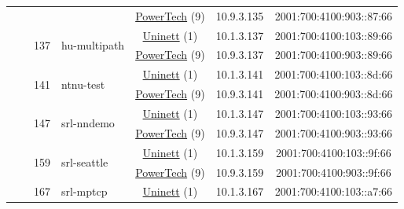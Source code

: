 \begin{small}
\begin{center}
\begin{longtable}{|c|c|c|c|c|c|c|c|}
  &  &  &  & \multicolumn{2}{|c|}{\tiny{\href{http://www.powertech.no}{PowerTech} (9)}} & \tiny{10.9.3.135} & \tiny{2001:700:4100:903::87:66} \\* \cline{3-3}\cline{4-4}\cline{5-5}\cline{6-6}\cline{7-7}\cline{8-8}
  &  & \multirow{2}{*}{\tiny{137}} & \multicolumn{1}{|l|}{\multirow{2}{*}{\tiny{hu-multipath}}} & \multicolumn{2}{|c|}{\tiny{\href{https://www.uninett.no}{Uninett} (1)}} & \tiny{10.1.3.137} & \tiny{2001:700:4100:103::89:66} \\* \cline{5-5}\cline{6-6}\cline{7-7}\cline{8-8}
  &  &  &  & \multicolumn{2}{|c|}{\tiny{\href{http://www.powertech.no}{PowerTech} (9)}} & \tiny{10.9.3.137} & \tiny{2001:700:4100:903::89:66} \\* \cline{3-3}\cline{4-4}\cline{5-5}\cline{6-6}\cline{7-7}\cline{8-8}
  &  & \multirow{2}{*}{\tiny{141}} & \multicolumn{1}{|l|}{\multirow{2}{*}{\tiny{ntnu-test}}} & \multicolumn{2}{|c|}{\tiny{\href{https://www.uninett.no}{Uninett} (1)}} & \tiny{10.1.3.141} & \tiny{2001:700:4100:103::8d:66} \\* \cline{5-5}\cline{6-6}\cline{7-7}\cline{8-8}
  &  &  &  & \multicolumn{2}{|c|}{\tiny{\href{http://www.powertech.no}{PowerTech} (9)}} & \tiny{10.9.3.141} & \tiny{2001:700:4100:903::8d:66} \\* \cline{3-3}\cline{4-4}\cline{5-5}\cline{6-6}\cline{7-7}\cline{8-8}
  &  & \multirow{2}{*}{\tiny{147}} & \multicolumn{1}{|l|}{\multirow{2}{*}{\tiny{srl-nndemo}}} & \multicolumn{2}{|c|}{\tiny{\href{https://www.uninett.no}{Uninett} (1)}} & \tiny{10.1.3.147} & \tiny{2001:700:4100:103::93:66} \\* \cline{5-5}\cline{6-6}\cline{7-7}\cline{8-8}
  &  &  &  & \multicolumn{2}{|c|}{\tiny{\href{http://www.powertech.no}{PowerTech} (9)}} & \tiny{10.9.3.147} & \tiny{2001:700:4100:903::93:66} \\* \cline{3-3}\cline{4-4}\cline{5-5}\cline{6-6}\cline{7-7}\cline{8-8}
  &  & \multirow{2}{*}{\tiny{159}} & \multicolumn{1}{|l|}{\multirow{2}{*}{\tiny{srl-seattle}}} & \multicolumn{2}{|c|}{\tiny{\href{https://www.uninett.no}{Uninett} (1)}} & \tiny{10.1.3.159} & \tiny{2001:700:4100:103::9f:66} \\* \cline{5-5}\cline{6-6}\cline{7-7}\cline{8-8}
  &  &  &  & \multicolumn{2}{|c|}{\tiny{\href{http://www.powertech.no}{PowerTech} (9)}} & \tiny{10.9.3.159} & \tiny{2001:700:4100:903::9f:66} \\* \cline{3-3}\cline{4-4}\cline{5-5}\cline{6-6}\cline{7-7}\cline{8-8}
  &  & \multirow{2}{*}{\tiny{167}} & \multicolumn{1}{|l|}{\multirow{2}{*}{\tiny{srl-mptcp}}} & \multicolumn{2}{|c|}{\tiny{\href{https://www.uninett.no}{Uninett} (1)}} & \tiny{10.1.3.167} & \tiny{2001:700:4100:103::a7:66} \\* \cline{5-5}\cline{6-6}\cline{7-7}\cline{8-8}

\end{longtable}
\end{center}
\end{small}
